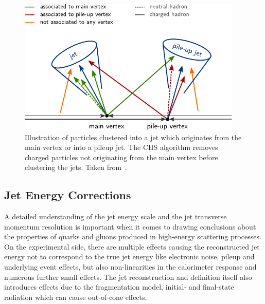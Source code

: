 \begin{figure}[tbhp]
    \centering
    \includegraphics[width=0.95\textwidth]{figures/experimental_setup/chs.pdf}
    \caption[Charged Hadron Subtraction]{Illustration of particles clustered
    into a jet which originates from the main vertex or into a pileup jet. The
    CHS algorithm removes charged particles not originating from the main vertex
    before clustering the jets. Taken from~\cite{Berger:2014aca}.}
    \label{fig:chs_jets}
\end{figure}

\subsection{Jet Energy Corrections}
\label{sec:jec}

A detailed understanding of the jet energy scale and the jet transverse momentum
resolution is important when it comes to drawing conclusions about the
properties of quarks and gluons produced in high-energy scattering processes. On the
experimental side, there are multiple effects causing the reconstructed jet
energy not to correspond to the true jet energy like electronic noise, pileup
and underlying event effects, but also non-linearities in the calorimeter
response and numerous further small effects. The jet reconstruction and
definition itself also introduces effects due to the fragmentation model,
initial- and final-state radiation which can cause out-of-cone effects.


